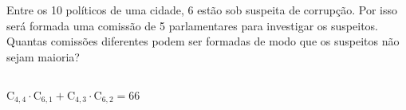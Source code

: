 \begin{ex}
 Entre os 10 políticos de uma cidade, 6 estão sob suspeita de corrupção. Por isso será formada uma comissão de 5 parlamentares para investigar os suspeitos. Quantas comissões diferentes podem ser formadas de modo que os suspeitos não sejam maioria?
   \begin{sol}
    \phantom{A}\\
    $\mathrm{C}_{4,4}\cdot \mathrm{C}_{6,1}+\mathrm{C}_{4,3}\cdot \mathrm{C}_{6,2}=66$
   \end{sol}
\end{ex}